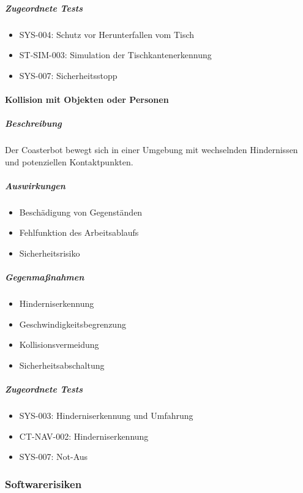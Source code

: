\subparagraph{Zugeordnete Tests}\label{zugeordnete-tests}

\begin{itemize}
\tightlist
\item
  SYS-004: Schutz vor Herunterfallen vom Tisch
\item
  ST-SIM-003: Simulation der Tischkantenerkennung
\item
  SYS-007: Sicherheitsstopp
\end{itemize}

\paragraph{Kollision mit Objekten oder
Personen}\label{kollision-mit-objekten-oder-personen}

\subparagraph{Beschreibung}\label{beschreibung-2}

Der Coasterbot bewegt sich in einer Umgebung mit wechselnden
Hindernissen und potenziellen Kontaktpunkten.

\subparagraph{Auswirkungen}\label{auswirkungen-2}

\begin{itemize}
\tightlist
\item
  Beschädigung von Gegenständen
\item
  Fehlfunktion des Arbeitsablaufs
\item
  Sicherheitsrisiko
\end{itemize}

\subparagraph{Gegenmaßnahmen}\label{gegenmauxdfnahmen-1}

\begin{itemize}
\tightlist
\item
  Hinderniserkennung
\item
  Geschwindigkeitsbegrenzung
\item
  Kollisionsvermeidung
\item
  Sicherheitsabschaltung
\end{itemize}

\subparagraph{Zugeordnete Tests}\label{zugeordnete-tests-1}

\begin{itemize}
\tightlist
\item
  SYS-003: Hinderniserkennung und Umfahrung
\item
  CT-NAV-002: Hinderniserkennung
\item
  SYS-007: Not-Aus
\end{itemize}

\subsubsection{Softwarerisiken}\label{softwarerisiken}

